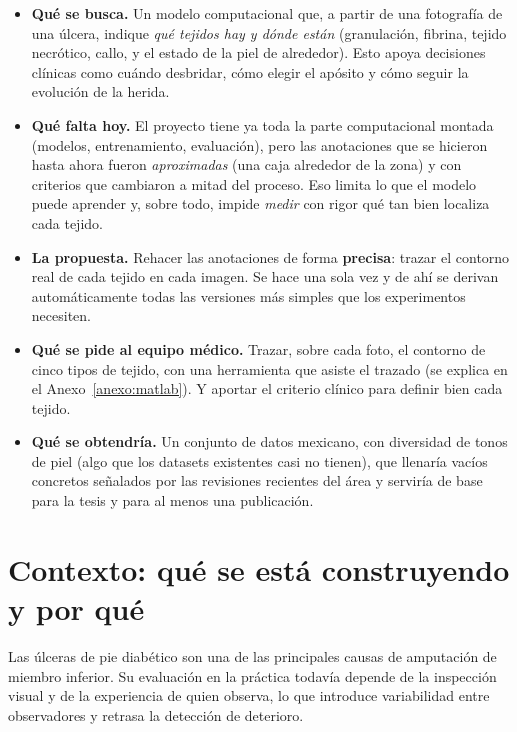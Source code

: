 \documentclass[12pt,letterpaper]{article}
\begin{document}
\begin{itemize}
  \item \textbf{Qué se busca.} Un modelo computacional que, a partir de una fotografía de una úlcera,
        indique \emph{qué tejidos hay y dónde están} (granulación, fibrina, tejido necrótico, callo,
        y el estado de la piel de alrededor). Esto apoya decisiones clínicas como cuándo desbridar,
        cómo elegir el apósito y cómo seguir la evolución de la herida.
  \item \textbf{Qué falta hoy.} El proyecto tiene ya toda la parte computacional montada (modelos,
        entrenamiento, evaluación), pero las anotaciones que se hicieron hasta ahora fueron
        \emph{aproximadas} (una caja alrededor de la zona) y con criterios que cambiaron a mitad del
        proceso. Eso limita lo que el modelo puede aprender y, sobre todo, impide \emph{medir} con
        rigor qué tan bien localiza cada tejido.
  \item \textbf{La propuesta.} Rehacer las anotaciones de forma \textbf{precisa}: trazar el contorno
        real de cada tejido en cada imagen. Se hace una sola vez y de ahí se derivan automáticamente
        todas las versiones más simples que los experimentos necesiten.
  \item \textbf{Qué se pide al equipo médico.} Trazar, sobre cada foto, el contorno de cinco tipos de
        tejido, con una herramienta que asiste el trazado (se explica en el Anexo~\ref{anexo:matlab}).
        Y aportar el criterio clínico para definir bien cada tejido.
  \item \textbf{Qué se obtendría.} Un conjunto de datos mexicano, con diversidad de tonos de piel
        (algo que los datasets existentes casi no tienen), que llenaría vacíos concretos señalados
        por las revisiones recientes del área y serviría de base para la tesis y para al menos una
        publicación.
\end{itemize}

\section{Contexto: qué se está construyendo y por qué}

Las úlceras de pie diabético son una de las principales causas de amputación de miembro inferior. Su
evaluación en la práctica todavía depende de la inspección visual y de la experiencia de quien
observa, lo que introduce variabilidad entre observadores y retrasa la detección de deterioro.
\end{document}
